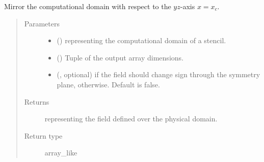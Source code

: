 \documentclass[letterpaper,10pt,english]{sphinxmanual}
\begin{document}
\begin{fulllineitems}
\begin{fulllineitems}
\begin{quote}
\begin{description}
\begin{itemize}
\end{itemize}

\end{description}\end{quote}

\end{fulllineitems}


\begin{fulllineitems}
\label{\detokenize{api:dycore.horizontal_boundary.RelaxedSymmetricYZ.from_computational_to_physical_domain}}
Mirror the computational domain with respect to the \(yz\)-axis \(x = x_c\).
\begin{quote}\begin{description}
\item[{Parameters}] \leavevmode\begin{itemize}
\item {} 
 () \textendash{}  representing the computational domain of a stencil.

\item {} 
 () \textendash{} Tuple of the output array dimensions.

\item {} 
 (, optional) \textendash{}  if the field should change sign through the symmetry plane,  otherwise.
Default is false.

\end{itemize}

\item[{Returns}] \leavevmode
{} representing the field defined over the physical domain.

\item[{Return type}] \leavevmode
array\_like

\end{description}\end{quote}


\end{fulllineitems}
\end{fulllineitems}
\end{document}
